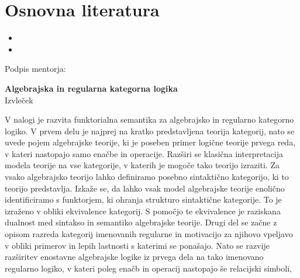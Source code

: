 \documentclass[12pt,a4paper]{book}
\begin{document}
\section*{Osnovna literatura}

\begin{itemize}
  \item {}
  \item {}
\end{itemize}

\vspace{2cm}
\hspace*{\fill} Podpis mentorja: \phantom{prostor za podpis}

\cleardoublepage
{}
\begin{center}
{\bf Algebrajska in regularna kategorna logika}\\[3mm]
{\sc  Izvleček}
\end{center}
\vspace{10mm}
V nalogi je razvita funktorialna semantika za algebrajsko in regularno kategorno logiko.
V prvem delu je najprej na kratko predstavljena teorija kategorij, nato se uvede
pojem algebrajske teorije, ki je poseben primer logične teorije prvega reda, v kateri
nastopajo samo enačbe in operacije. Razširi se klasična interpretacija modela teorije
na vse kategorije, v katerih je mogoče tako teorijo izraziti.
Za vsako algebrajsko teorijo lahko definiramo posebno sintaktično kategorijo,
ki to teorijo predstavlja. Izkaže se, da lahko vsak model algebrajske teorije
enolično identificiramo s funktorjem, ki ohranja strukturo sintaktične kategorije.
To je izraženo v obliki ekvivalence kategorij. S pomočjo te ekvivalence je raziskana
dualnost med sintakso in semantiko algebrajske teorije.
Drugi del se začne z opisom razreda kategorij imenovanih regularne in motivacijo
za njihovo vpeljavo v obliki primerov in lepih lastnosti s katerimi se ponašajo.
Nato se razvije razširitev enostavne algebrajske logike iz prvega dela na tako imenovano
regularno logiko, v kateri poleg enačb in operacij nastopajo še relacijski simboli,
\end{document}
